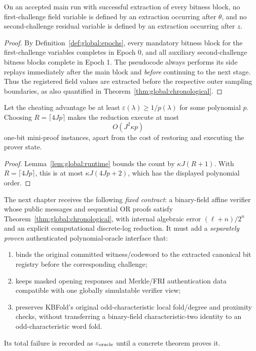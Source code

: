 \begin{lemma}\label{lem:global:before-use}
On an accepted main run with
successful extraction of every
bitness block, no first-challenge
field variable is defined by an
extraction occurring after $\theta$,
and no second-challenge residual
variable is defined by an extraction
occurring after $z$.
\end{lemma}
\begin{proof}
By Definition~\ref{def:global:epochs},
every mandatory bitness block
for the first-challenge variables
completes in Epoch 0, and all
auxiliary second-challenge bitness
blocks complete in Epoch 1.
The pseudocode always performs
its side replays immediately
after the main block and
\emph{before} continuing to the
next stage. Thus the registered
field values are extracted before
the respective outer sampling
boundaries, as also quantified
in Theorem~\ref{thm:global:chronological}.
\end{proof}

\begin{proposition}\label{prop:global:polynomial}
Let the cheating advantage be at
least $\varepsilon(\lambda)\ge1/p(\lambda)$
for some polynomial $p$. Choosing
$R=\lceil4Jp\rceil$ makes the
reduction execute at most
\[
 \boxed{O(J^2\kappa p)}
\]
one-bit mini-proof instances,
apart from the cost of restoring
and executing the prover state.
\end{proposition}
\begin{proof}
Lemma~\ref{lem:global:runtime}
bounds the count by
$\kappa J(R+1)$.
With $R=\lceil4Jp\rceil$,
this is at most
$\kappa J(4Jp+2)$,
which has the displayed
polynomial order.
\end{proof}

\begin{definition}\label{def:global:external}
The next chapter receives the
following \emph{fixed contract}:
a binary-field affine verifier
whose public messages and
sequential OR proofs satisfy
Theorem~\ref{thm:global:chronological},
with internal algebraic error
$(\ell+n)/2^n$ and an explicit
computational discrete-log
reduction. It must add a
\emph{separately proven}
authenticated polynomial-oracle
interface that:
\begin{enumerate}[label=\textup{(\roman*)}]
\item binds the original committed
witness/codeword to the extracted
canonical bit registry before
the corresponding challenge;
\item keeps masked opening responses
and Merkle/FRI authentication data
compatible with one globally
simulatable verifier view;
\item preserves KBFold's original
odd-characteristic local
fold/degree and proximity checks,
without transferring a binary-field
characteristic-two identity to
an odd-characteristic word fold.
\end{enumerate}
Its total failure is recorded as
$\varepsilon_{\rm oracle}$ until
a concrete theorem proves it.
\end{definition}

